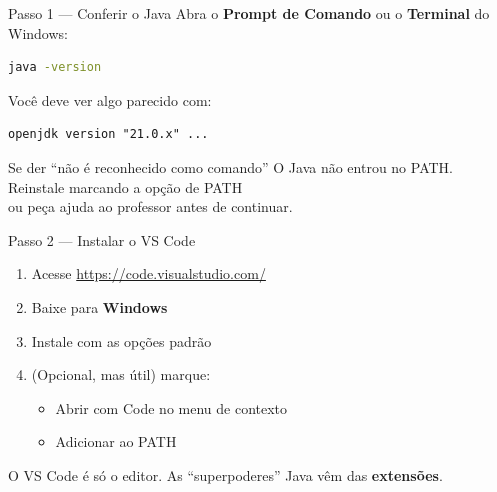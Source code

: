 \documentclass[aspectratio=169,11pt]{beamer}
\begin{document}
\begin{frame}[fragile]{Passo 1 --- Conferir o Java}
  Abra o \textbf{Prompt de Comando} ou o \textbf{Terminal} do Windows:

  \vspace{0.4em}
\begin{lstlisting}[language=bash]
java -version
\end{lstlisting}

  \vspace{0.4em}
  Você deve ver algo parecido com:

\begin{lstlisting}[basicstyle=\ttfamily\scriptsize]
openjdk version "21.0.x" ...
\end{lstlisting}

  \vspace{0.5em}
  \begin{block}{Se der ``não é reconhecido como comando''}
    O Java não entrou no PATH. Reinstale marcando a opção de PATH\\
    ou peça ajuda ao professor antes de continuar.
  \end{block}
\end{frame}

\begin{frame}{Passo 2 --- Instalar o VS Code}
  \begin{enumerate}
    \item Acesse \url{https://code.visualstudio.com/}
    \item Baixe para \textbf{Windows}
    \item Instale com as opções padrão
    \item (Opcional, mas útil) marque:
      \begin{itemize}
        \item Abrir com Code no menu de contexto
        \item Adicionar ao PATH
      \end{itemize}
  \end{enumerate}

  \vspace{0.6em}
  O VS Code é só o editor. As “superpoderes” Java vêm das \textbf{extensões}.
\end{frame}
\end{document}
